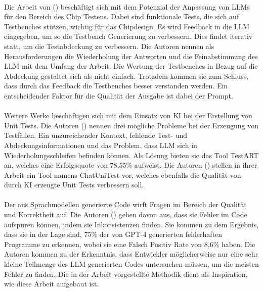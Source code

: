\documentclass[12pt,toc=bib,toc=listof]{scrreprt}
\begin{document}
\\
Die Arbeit von (\cite{Bhandari2024}) beschäftigt sich mit dem Potenzial der Anpassung von LLMs für den Bereich des Chip Testens. Dabei sind funktionale Tests, die sich auf Testbenches stützen, wichtig für das Chipdesign. Es wird Feedback in die LLM eingegeben, um so die Testbench Generierung zu verbessern. Dies findet iterativ statt, um die Testabdeckung zu verbessern. Die Autoren nennen als Herausforderungen die Wiederholung der Antworten und die Feinabstimmung des LLM mit dem Umfang der Arbeit. Die Wertung der Testbenches in Bezug auf die Abdeckung gestaltet sich als nicht einfach. Trotzdem kommen sie zum Schluss, dass durch das Feedback die Testbenches besser verstanden werden. Ein entscheidender Faktor für die Qualität der Ausgabe ist dabei der Prompt.\\
\\
Weitere Werke beschäftigen sich mit dem Einsatz von KI bei der Erstellung von Unit Tests. Die Autoren (\cite{Gu2024}) nennen drei mögliche Probleme bei der Erzeugung von Testfällen. 
Ein unzureichender Kontext, fehlende Test- und Abdeckungsinformationen und das Problem, dass LLM sich in Wiederholungsschleifen befinden können. Als Lösung bieten sie das Tool TestART an, welches eine Erfolgsquote von 78,55\% aufweist. Die Autoren (\cite{Chen2024}) stellen in ihrer Arbeit ein Tool namens ChatUniTest vor, welches ebenfalls die Qualität von durch KI erzeugte Unit Tests verbessern soll.\\
\\
Der aus Sprachmodellen generierte Code wirft Fragen im Bereich der Qualität und Korrektheit auf. Die Autoren (\cite{Wang2024}) gehen davon aus, dass sie Fehler im Code aufspüren können, indem sie Inkonsistenzen finden. Sie kommen zu dem Ergebnis, dass sie in der Lage sind, 75\% der von GPT-4 generierten fehlerhaften Programme zu erkennen, wobei sie eine Falsch Positiv Rate von 8,6\% haben. Die Autoren kommen zu der Erkenntnis, dass Entwickler möglicherweise nur eine sehr kleine Teilmenge des LLM generierten Codes untersuchen müssen, um die meisten Fehler zu finden. Die in der Arbeit vorgestellte Methodik dient als Inspiration, wie diese Arbeit aufgebaut ist.
\end{document}
